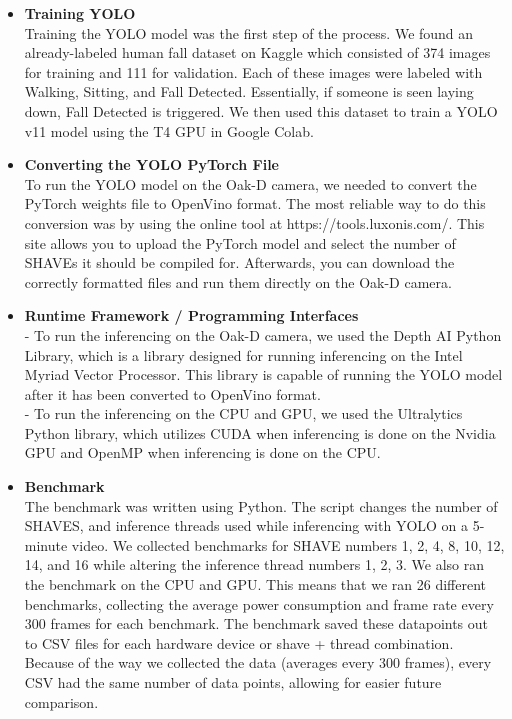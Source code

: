 \documentclass[sigconf,authorversion,nonacm]{acmart}
\begin{document}
\begin{itemize}
    \item \textbf{Training YOLO} \\ Training the YOLO model was the first step of the process. We found an already-labeled human fall dataset on Kaggle which consisted of 374 images for training and 111 for validation. Each of these images were labeled with Walking, Sitting, and Fall Detected. Essentially, if someone is seen laying down, Fall Detected is triggered. We then used this dataset to train a YOLO v11 model using the T4 GPU in Google Colab.
    \item \textbf{Converting the YOLO PyTorch File} \\ To run the YOLO model on the Oak-D camera, we needed to convert the PyTorch weights file to OpenVino format. The most reliable way to do this conversion was by using the online tool at https://tools.luxonis.com/. This site allows you to upload the PyTorch model and select the number of SHAVEs it should be compiled for. Afterwards, you can download the correctly formatted files and run them directly on the Oak-D camera. 
    \item \textbf{Runtime Framework / Programming Interfaces} \\ - To run the inferencing on the Oak-D camera, we used the Depth AI Python Library, which is a library designed for running inferencing on the Intel Myriad Vector Processor. This library is capable of running the YOLO model after it has been converted to OpenVino format. \\ - To run the inferencing on the CPU and GPU, we used the Ultralytics Python library, which utilizes CUDA when inferencing is done on the Nvidia GPU and OpenMP when inferencing is done on the CPU.
    \item \textbf{Benchmark} \\ The benchmark was written using Python. The script changes the number of SHAVES, and inference threads used while inferencing with YOLO on a 5-minute video. We collected benchmarks for SHAVE numbers 1, 2, 4, 8, 10, 12, 14, and 16 while altering the inference thread numbers 1, 2, 3. We also ran the benchmark on the CPU and GPU. This means that we ran 26 different benchmarks, collecting the average power consumption and frame rate every 300 frames for each benchmark. The benchmark saved these datapoints out to CSV files for each hardware device or shave + thread combination. Because of the way we collected the data (averages every 300 frames), every CSV had the same number of data points, allowing for easier future comparison.
\end{itemize}
\end{document}
